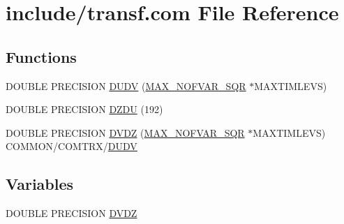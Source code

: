 \hypertarget{home_2abonfi_2_c_f_d__codes_2_eul_f_s_83_84_2include_2transf_8com}{\section{include/transf.com File Reference}
\label{home_2abonfi_2_c_f_d__codes_2_eul_f_s_83_84_2include_2transf_8com}
}
\subsection*{Functions}
\begin{DoxyCompactItemize}
\item 
D\-O\-U\-B\-L\-E P\-R\-E\-C\-I\-S\-I\-O\-N \hyperlink{home_2abonfi_2_c_f_d__codes_2_eul_f_s_83_84_2include_2transf_8com_a8e878d3244ead9471a3061a190818761}{D\-U\-D\-V} (\hyperlink{msa20_2home_2abonfi_2_c_f_d__codes_2_eul_f_s_83_82_83_2include_2paramt_8h_a7655047f32c8c333f5412ebb47ac3e25}{M\-A\-X\-\_\-\-N\-O\-F\-V\-A\-R\-\_\-\-S\-Q\-R} $\ast$M\-A\-X\-T\-I\-M\-L\-E\-V\-S)
\item 
D\-O\-U\-B\-L\-E P\-R\-E\-C\-I\-S\-I\-O\-N \hyperlink{home_2abonfi_2_c_f_d__codes_2_eul_f_s_83_84_2include_2transf_8com_aa26787af536504466ab8cf4e2431b763}{D\-Z\-D\-U} (192)
\item 
D\-O\-U\-B\-L\-E P\-R\-E\-C\-I\-S\-I\-O\-N \hyperlink{home_2abonfi_2_c_f_d__codes_2_eul_f_s_83_84_2include_2transf_8com_a9e0bfeb32fc4aec64d9cbee966142e0f}{D\-V\-D\-Z} (\hyperlink{msa20_2home_2abonfi_2_c_f_d__codes_2_eul_f_s_83_82_83_2include_2paramt_8h_a7655047f32c8c333f5412ebb47ac3e25}{M\-A\-X\-\_\-\-N\-O\-F\-V\-A\-R\-\_\-\-S\-Q\-R} $\ast$M\-A\-X\-T\-I\-M\-L\-E\-V\-S) C\-O\-M\-M\-O\-N/C\-O\-M\-T\-R\-X/\hyperlink{msa20_2home_2abonfi_2_c_f_d__codes_2_eul_f_s_83_82_83_2include_2transf_8com_a8e878d3244ead9471a3061a190818761}{D\-U\-D\-V}
\end{DoxyCompactItemize}
\subsection*{Variables}
\begin{DoxyCompactItemize}
\item 
D\-O\-U\-B\-L\-E P\-R\-E\-C\-I\-S\-I\-O\-N \hyperlink{home_2abonfi_2_c_f_d__codes_2_eul_f_s_83_84_2include_2transf_8com_a429c5f2318702f4852a08f2d450c8a69}{D\-V\-D\-Z}
\end{DoxyCompactItemize}



